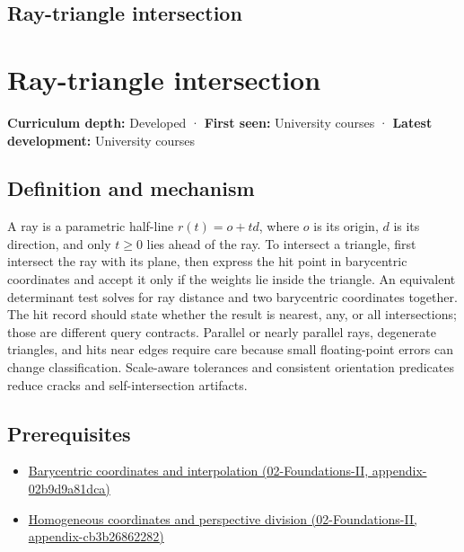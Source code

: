 \hypertarget{appendix-47ac1bd6d144}{}
\section*{Ray-triangle intersection}
\chapter{Ray-triangle intersection}\label{appendix-47ac1bd6d144-ray-triangle-intersection}

\textbf{Curriculum depth:} Developed · \textbf{First seen:} University courses · \textbf{Latest development:} University courses

\section{Definition and mechanism}\label{appendix-47ac1bd6d144-definition-and-mechanism}

A ray is a parametric half-line \(r(t)=o+td\), where \(o\) is its origin, \(d\) is its direction, and only \(t\ge0\) lies ahead of the ray. To intersect a triangle, first intersect the ray with its plane, then express the hit point in barycentric coordinates and accept it only if the weights lie inside the triangle. An equivalent determinant test solves for ray distance and two barycentric coordinates together. The hit record should state whether the result is nearest, any, or all intersections; those are different query contracts. Parallel or nearly parallel rays, degenerate triangles, and hits near edges require care because small floating-point errors can change classification. Scale-aware tolerances and consistent orientation predicates reduce cracks and self-intersection artifacts.

\section{Prerequisites}\label{appendix-47ac1bd6d144-prerequisites}

\begin{itemize}
\tightlist
\item
  \href{../02-Foundations-II/main.pdf\#nameddest=appendix-02b9d9a81dca}{Barycentric coordinates and interpolation (02-Foundations-II, appendix-02b9d9a81dca)}
\item
  \href{../02-Foundations-II/main.pdf\#nameddest=appendix-cb3b26862282}{Homogeneous coordinates and perspective division (02-Foundations-II, appendix-cb3b26862282)}
\end{itemize}

